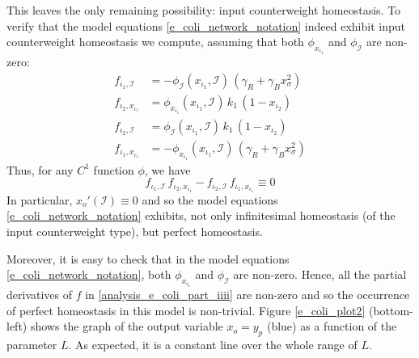 \documentclass[a4paper,fleqn]{cas-dc}
\begin{document}
This leaves the only remaining possibility: input counterweight homeostasis. To verify that the model equations \eqref{e_coli_network_notation} indeed exhibit input counterweight homeostasis we compute, assuming that both $\phi_{x_{\iota_1}}$ and $\phi_{\mathcal{I}}$ are non-zero:
\begin{equation} \label{analysis_e_coli_part_iiii}
\begin{aligned}
f_{\iota_{1}, \mathcal{I}} & = - \phi_{\mathcal{I}} (x_{\iota_1},\mathcal{I})  \, (\gamma_{R} + \gamma_{B}x_{\sigma}^{2}) \\
f_{\iota_{2}, x_{\iota_1}} & = \phi_{x_{\iota_1}} (x_{\iota_1},\mathcal{I}) \, k_{1} \, (1 - x_{\iota_2}) \\
f_{\iota_{2}, \mathcal{I}} & = \phi_{\mathcal{I}} (x_{\iota_1},\mathcal{I})  \, k_{1} \, (1 - x_{\iota_2}) \\
f_{\iota_{1}, x_{\iota_1}} & = -\phi_{x_{\iota_1}} (x_{\iota_1},\mathcal{I}) \, (\gamma_{R} + \gamma_{B}x_{\sigma}^{2})
\end{aligned}
\end{equation}
Thus, for any $C^1$ function $\phi$, we have
\begin{equation} \label{analysis_e_coli_part_v}
f_{\iota_{1}, \mathcal{I}} \, f_{\iota_{2}, x_{\iota_{1}}} - f_{\iota_{2}, \mathcal{I}} \, f_{\iota_{1}, x_{\iota_{1}}} \equiv 0
\end{equation}
In particular, $x_o'(\mathcal{I})\equiv 0$ and so the model equations \eqref{e_coli_network_notation} exhibits, not only infinitesimal homeostasis (of the input counterweight type), but perfect homeostasis.

Moreover, it is easy to check that in the model equations \eqref{e_coli_network_notation}, both $\phi_{x_{\iota_1}}$ and $\phi_{\mathcal{I}}$ are non-zero.
Hence, all the partial derivatives of $f$ in \eqref{analysis_e_coli_part_iiii} are non-zero and so the occurrence of perfect homeostasis in this model is non-trivial.
Figure \ref{e_coli_plot2} (bottom-left) shows the graph of the output variable $x_o = y_p$ (blue) as a function of the parameter $L$.
As expected, it is a constant line over the whole range of $L$.
\end{document}
